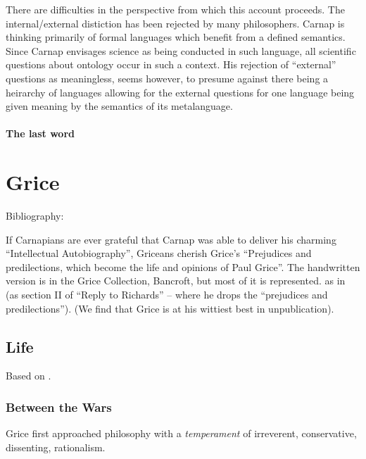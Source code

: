 \documentclass[10pt,titlepage]{book}
\begin{document}
There are difficulties in the perspective from which this account proceeds.
The internal/external distiction has been rejected by many philosophers.
Carnap is thinking primarily of formal languages which benefit from a defined semantics.
Since Carnap envisages science as being conducted in such language, all scientific questions about ontology occur in such a context.
His rejection of ``external'' questions as meaningless, seems however, to presume against there being a heirarchy of languages allowing for the external questions for one language being given meaning by the semantics of its metalanguage.

\subsubsection{The last word}



\chapter{Grice}

Bibliography:
\cite{grice41}
\cite{grice86}
\cite{grice86a}
\cite{grice87}
\cite{grice88}
\cite{grice89}
\cite{grice91}
\cite{grice01}
\cite{grice57}
\cite{pears57}
\cite{speranza89}
\cite{speranza91a}
\cite{speranza91b}
\cite{speranza95}

If Carnapians are ever grateful that Carnap was able to deliver his charming ``Intellectual Autobiography'', Griceans cherish Grice's ``Prejudices and predilections, which become the life and opinions of Paul Grice''\cite{grice86c}.
The handwritten version is in the Grice Collection, Bancroft, but most of it is represented. as \cite{grice86c} in \cite{grice86a} (as section II of ``Reply to Richards'' -- where he drops the ``prejudices and predilections'').
(We find that Grice is at his wittiest best in unpublication).

\section{Life}

Based on \cite{grice86c}.

\subsection{Between the Wars}

Grice first approached philosophy with a \emph{temperament} of irreverent, conservative, dissenting, rationalism.
\end{document}
